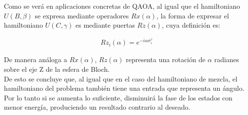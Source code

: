 Como se verá en aplicaciones concretas de QAOA, al igual que el hamiltoniano $U(B, \beta)$ se expresa mediante operadores $Rx(\alpha)$, la forma de expresar el hamiltoniano $U(C, \gamma)$ es mediante puertas $Rz(\alpha)$, cuya definición es:

\begin{align}
  Rz_i(\alpha) = e^{-i \alpha \sigma^z_i}
\end{align}

De manera análoga a $Rx(\alpha)$, $Rz(\alpha)$ representa una rotación de $\alpha$ radianes sobre el eje Z de la esfera de Bloch.
\\
De esto se concluye que, al igual que en el caso del hamiltoniano de mezcla, el hamiltoniano del problema también tiene una entrada que representa un ángulo.
Por lo tanto si se aumenta lo suficiente, disminuirá la fase de los estados con menor energía, produciendo un resultado contrario al deseado.


